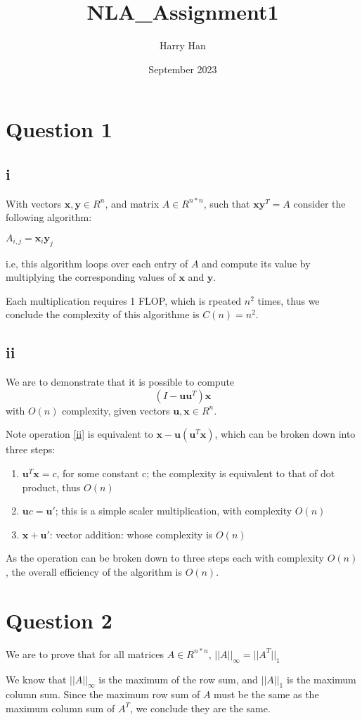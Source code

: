 \documentclass{article}
\title{NLA\_Assignment1}
\author{Harry Han}
\date{September 2023}
\begin{document}
\section{Question 1}
\subsection*{i}

With vectors $\bm{x}, \bm{y} \in R^n$, and matrix $A\in R^{n*n}$, such that $\bm{x}\bm{y}^T = A$ consider the following algorithm:

\begin{algorithmic}[1] 
        \State $A_{i, j} = \bm{x}_i\bm{y}_j  $
    \EndFor
\EndFor
\end{algorithmic}

i.e, this algorithm loops over each entry of $A$ and compute its value by multiplying the corresponding values of $\bm{x}$ and $\bm{y}$. 

Each multiplication requires 1 FLOP, which is rpeated $n^2$ times, thus we conclude the complexity of this algorithme is $C(n) = n^2$.

\subsection*{ii}

We are to demonstrate that it is possible to compute 
\begin{equation}
\label{ii}
    (I-\bm{u}\bm{u}^T)\bm{x}
\end{equation}
with $O(n)$ complexity, given vectors $\bm{u}, \bm{x} \in R^n$.

Note operation \ref{ii} is equivalent to $\bm{x}-\bm{u}(\bm{u}^T\bm{x})$, which can be broken down into three steps:

\begin{enumerate}
    \item $\bm{u}^T\bm{x}=c$, for some constant c; the complexity is equivalent to that of dot product, thus $O(n)$
    \item $\bm{u}c = \bm{u}'$; this is a simple scaler multiplication, with complexity $O(n)$
    \item $\bm{x} + \bm{u}'$: vector addition: whose complexity is $O(n)$
\end{enumerate}

As the operation can be broken down to three steps each with complexity $O(n)$, the overall efficiency of the algorithm is $O(n)$.

\newpage 

\section{Question 2}

We are to prove that for all matrices $A \in R^{n*n}$, $||A||_\infty = ||A^T||_1 $

We know that $||A||_\infty$ is the maximum of the row sum, and $||A||_1$ is the maximum column sum. Since the maximum row sum of $A$ must be the same as the maximum column sum of $A^T$, we conclude they are the same.
\end{document}
